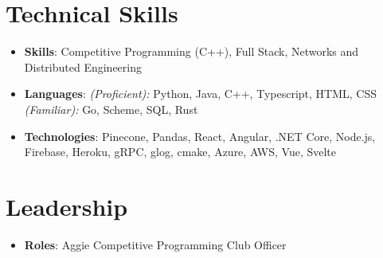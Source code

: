 \documentclass[letterpaper,10pt]{article}
\newcommand{\resumeItem}[2]{
  \item\small{
    \textbf{#1}{: #2 \vspace{-2pt}}
  }
}
\newcommand{\resumeSubItem}[2]{\resumeItem{#1}{#2}\vspace{-4pt}}
\newcommand{\resumeSubHeadingListStart}{\begin{itemize}[leftmargin=*]}
\newcommand{\resumeSubHeadingListEnd}{\end{itemize}}
\begin{document}
\section{Technical Skills}
  \resumeSubHeadingListStart
    \resumeSubItem{
      \textbf{Skills}} {Competitive Programming (C++), Full Stack, Networks and Distributed Engineering}
    \resumeSubItem{
      \textbf{Languages}} {\textit{(Proficient):} Python, Java, C++, Typescript, HTML, CSS \textit{(Familiar):} Go, Scheme, SQL, Rust}
    \resumeSubItem{
      \textbf{Technologies}}{Pinecone, Pandas, React, Angular, .NET Core, Node.js, Firebase, Heroku, gRPC, glog, cmake, Azure, AWS, Vue, Svelte}
  \resumeSubHeadingListEnd
\section{Leadership}
	\resumeSubHeadingListStart
		\resumeSubItem{\textbf{Roles}}{Aggie Competitive Programming Club Officer}
	\resumeSubHeadingListEnd

\end{document}

